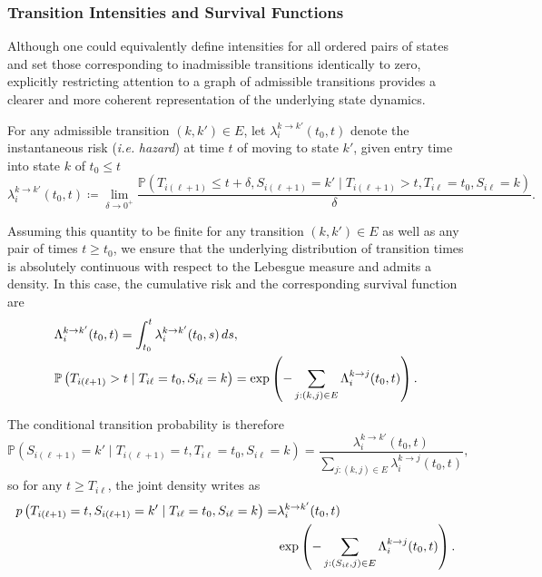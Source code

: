 \documentclass{sn-jnl}
\begin{document}
\subsubsection{Transition Intensities and Survival Functions}

Although one could equivalently define intensities for all ordered pairs of states and set those corresponding to inadmissible transitions identically to zero, explicitly restricting attention to a graph of admissible transitions provides a clearer and more coherent representation of the underlying state dynamics.

\bigbreak

For any admissible transition $(k, k') \in E$, let $\lambda_i^{k \to k'}(t_0, t)$ denote the instantaneous risk (\textit{i.e.} \emph{hazard}) at time $t$ of moving to state $k'$, given entry time into state $k$ of $t_0 \leq t$
\[
    \lambda_i^{k \to k'}(t_0, t) \coloneqq \lim_{\delta \to 0^+}
    \frac{\mathbb{P}(T_{i(\ell+1)} \leq t + \delta, S_{i(\ell+1)}=k' \mid T_{i(\ell+1)} > t, T_{i\ell}=t_0, S_{i\ell}=k)}{\delta}.
\]

Assuming this quantity to be finite for any transition $(k, k') \in E$ as well as any pair of times $t \geq t_0$, we ensure that the underlying distribution of transition times is absolutely continuous with respect to the Lebesgue measure and admits a density. In this case, the cumulative risk and the corresponding survival function are
\begin{align}
     &\Lambda_i^{k \to k'}(t_0, t) = \int_{t_0}^{t} \lambda_i^{k \to k'}(t_0, s) \, ds, \notag \\
     &\mathbb{P}\left( T_{i(\ell+1)} > t \mid T_{i\ell}=t_0, S_{i\ell}=k \right) = \exp\left( -\sum_{j : (k, j) \in E}
        \Lambda_i^{k \to j}(t_0, t) \right) \label{eq:survival}.
\end{align}

The conditional transition probability is therefore
\begin{equation}
    \mathbb{P}\left( S_{i(\ell+1)} = k' \mid T_{i(\ell+1)}=t, T_{i\ell}=t_0, S_{i\ell}=k \right) = \frac{\lambda_i^{k \to k'}(t_0, t)}{\sum_{j : (k, j) \in E} \lambda_i^{k \to j}(t_0, t)} \label{eq:conditional},
\end{equation}
so for any $t \geq T_{i\ell}$, the joint density  writes as
\begin{align}
p\left( T_{i(\ell+1)}=t, S_{i(\ell+1)}=k' \mid T_{i\ell}=t_0, S_{i\ell}=k \right) = &\lambda_i^{k \to k'}(t_0, t) \notag \\
&\exp\left( -\sum_{j : (S_{i\ell}, j) \in E} \Lambda_i^{k \to j}(t_0, t) \right). \label{eq:transition-density}
\end{align}
\end{document}

